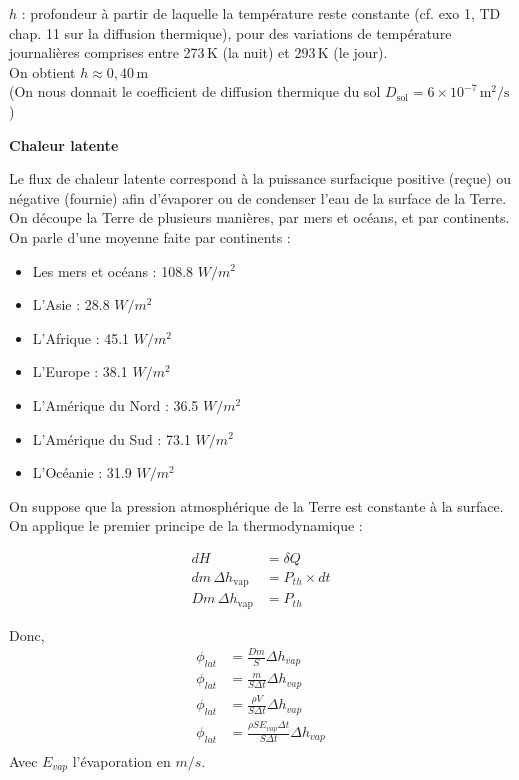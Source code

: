 \documentclass[a4paper,12pt]{article}
\begin{document}
\(h\) : profondeur à partir de laquelle la température reste constante (cf. exo 1, TD chap. 11 sur la diffusion thermique), pour des variations de température journalières comprises entre 273\,K (la nuit) et 293\,K (le jour).
\\

On obtient \( h \approx 0{,}40\,\mathrm{m} \)
\\

(On nous donnait le coefficient de diffusion thermique du sol \( D_{\text{sol}} = 6 \times 10^{-7} \,\mathrm{m}^2/\mathrm{s} \))

\textbf{Chaleur latente}



Le flux de chaleur latente correspond à la puissance surfacique positive (reçue) ou négative (fournie) afin d'évaporer ou de condenser l'eau de la surface de la Terre.
On découpe la Terre de plusieurs manières, par mers et océans, et par continents. 
On parle d'une moyenne faite par continents :
\begin{itemize}
    \item Les mers et océans : 108.8 $W/m^2$
    \item L'Asie : 28.8 $W/m^2$
    \item L'Afrique : 45.1 $W/m^2$
    \item L'Europe : 38.1 $W/m^2$
    \item L'Amérique du Nord : 36.5 $W/m^2$
    \item L'Amérique du Sud : 73.1 $W/m^2$
    \item L'Océanie : 31.9 $W/m^2$
\end{itemize}

On suppose que la pression atmosphérique de la Terre est constante à la surface. On applique le premier principe de la thermodynamique :

\vspace{1cm}
\begin{align*}
    dH &= \delta Q \\
    dm \, \Delta h_{\text{vap}} &= P_{th} \times dt \\
    Dm \, \Delta h_{\text{vap}} &= P_{th}
\end{align*}

Donc, 
\begin{align*}
    \phi _{lat} &= \frac{Dm}{S}\Delta h_{vap}\\
    \phi _{lat} &= \frac{m}{S\Delta t}\Delta h_{vap}\\
    \phi _{lat} &= \frac{\rho V}{S\Delta t}\Delta h_{vap}\\
    \phi _{lat} &= \frac{\rho S E_{vap} \Delta t}{S\Delta t}\Delta h_{vap}\\
\end{align*}
Avec $E_{vap}$ l'évaporation en $m/s$.
\end{document}
